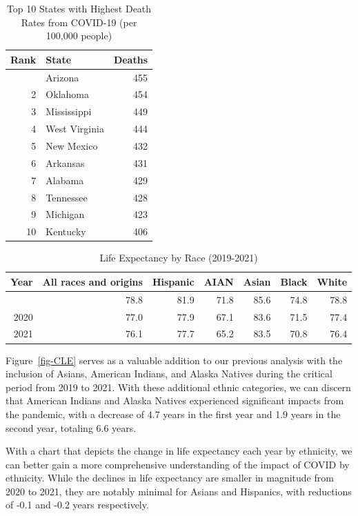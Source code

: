 \documentclass[
  letterpaper,
  DIV=11,
  numbers=noendperiod]{scrartcl}
\begin{document}
\hypertarget{tbl-deaths}{}
\begin{longtable}{rlr}
\caption{\label{tbl-deaths}Top 10 States with Highest Death Rates from COVID-19 (per 100,000
people) }\tabularnewline

\toprule
Rank & State & Deaths \\ 
\midrule\addlinespace[2.5pt]
1 & Arizona & 455 \\ 
2 & Oklahoma & 454 \\ 
3 & Mississippi & 449 \\ 
4 & West Virginia & 444 \\ 
5 & New Mexico & 432 \\ 
6 & Arkansas & 431 \\ 
7 & Alabama & 429 \\ 
8 & Tennessee & 428 \\ 
9 & Michigan & 423 \\ 
10 & Kentucky & 406 \\ 
\bottomrule
\end{longtable}

\newpage

\hypertarget{tbl-life-exp}{}
\begin{longtable}{rrrrrrr}
\caption{\label{tbl-life-exp}Life Expectancy by Race (2019-2021) }\tabularnewline

\toprule
Year & All races and origins & Hispanic & AIAN & Asian & Black & White \\ 
\midrule\addlinespace[2.5pt]
2019 & 78.8 & 81.9 & 71.8 & 85.6 & 74.8 & 78.8 \\ 
2020 & 77.0 & 77.9 & 67.1 & 83.6 & 71.5 & 77.4 \\ 
2021 & 76.1 & 77.7 & 65.2 & 83.5 & 70.8 & 76.4 \\ 
\bottomrule
\end{longtable}

Figure~\ref{fig-CLE} serves as a valuable addition to our previous
analysis with the inclusion of Asians, American Indians, and Alaska
Natives during the critical period from 2019 to 2021. With these
additional ethnic categories, we can discern that American Indians and
Alaska Natives experienced significant impacts from the pandemic, with a
decrease of 4.7 years in the first year and 1.9 years in the second
year, totaling 6.6 years.

With a chart that depicts the change in life expectancy each year by
ethnicity, we can better gain a more comprehensive understanding of the
impact of COVID by ethnicity. While the declines in life expectancy are
smaller in magnitude from 2020 to 2021, they are notably minimal for
Asians and Hispanics, with reductions of -0.1 and -0.2 years
respectively.
\end{document}
